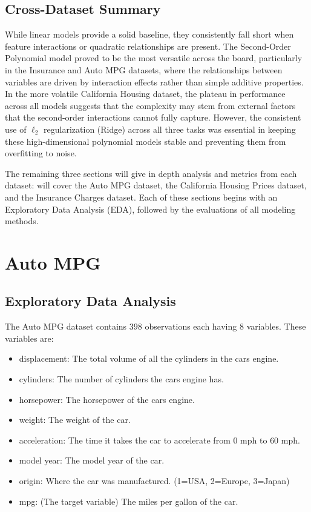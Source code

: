 \documentclass{article}
\begin{document}
\subsection{Cross-Dataset Summary}

While linear models provide a solid baseline, they consistently fall short when feature interactions or quadratic relationships are present. The Second-Order Polynomial model proved to be the most versatile across the board, particularly in the Insurance and Auto MPG datasets, where the relationships between variables are driven by interaction effects rather than simple additive properties. In the more volatile California Housing dataset, the plateau in performance across all models suggests that the complexity may stem from external factors that the second-order interactions cannot fully capture. However, the consistent use of $\ell_2$ regularization (Ridge) across all three tasks was essential in keeping these high-dimensional polynomial models stable and preventing them from overfitting to noise.

The remaining three sections will give in depth analysis and metrics from each dataset:  will cover the Auto MPG dataset,  the California Housing Prices dataset, and  the Insurance Charges dataset. Each of these sections begins with an Exploratory Data Analysis (EDA), followed by the evaluations of all modeling methods.

\section{Auto MPG}\label{Auto MPG}

\subsection{Exploratory Data Analysis}

The Auto MPG dataset contains $398$ observations each having $8$ variables. These variables are:
\begin{itemize}
	\item displacement: The total volume of all the cylinders in the cars engine.
	\item cylinders: The number of cylinders the cars engine has.
	\item horsepower: The horsepower of the cars engine.
	\item weight: The weight of the car.
	\item acceleration: The time it takes the car to accelerate from $0$ mph to $60$ mph.
	\item model year: The model year of the car.
	\item origin: Where the car was manufactured. (1=USA, 2=Europe, 3=Japan)
	\item mpg: (The target variable) The miles per gallon of the car.
\end{itemize}
\end{document}
